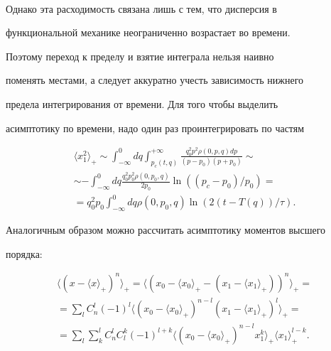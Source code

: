 $$

Однако эта расходимость связана лишь с тем, что дисперсия в

функциональной механике неограниченно возрастает во времени.

Поэтому переход к пределу и взятие интеграла нельзя наивно

поменять местами, а следует аккуратно учесть зависимость нижнего

предела интегрирования от времени. Для того чтобы выделить

асимптотику по времени, надо один раз проинтегрировать по частям



\pagebreak



\begin{multline}

\langle x_1^2\rangle_{+}\sim \int_{-\infty}^{0}

dq\int_{p_c(t,q)}^{+\infty}\frac{q^2_0p^2\rho

(0,p,q)dp}{(p-p_0)(p+p_0)}\sim

\\

\sim -\int_{-\infty}^{0}

dq\frac{q^2_0p^2_0\rho

(0,p_0,q)}{2p_0}\ln((p_c-p_0)/p_0)=

\\

=q^2_0p_0\int_{-\infty}^{0}

dq\rho (0,p_0,q)\ln(2(t-T(q))/\tau).

\end{multline}



Аналогичным образом можно рассчитать асимптотику моментов высшего

порядка:

\begin{multline}

\langle(x-\langle x\rangle_{+})^n\rangle_{+}=\langle(x_0-\langle

x_0\rangle_{+} -(x_1- \langle

x_1\rangle_{+}))^n\rangle_{+}=

\\

=\sum_l C_n^l

(-1)^l\langle(x_0-\langle x_0\rangle_{+})^{n-l}(x_1- \langle

x_1\rangle_{+})^l\rangle_{+}=

\\

=\sum_l\sum_k^{l} C_n^lC_l^k

(-1)^{l+k}\langle(x_0-\langle

x_0\rangle_{+})^{n-l}x_1^k\rangle_{+} \langle x_1\rangle^{l-k}_{+}.

\end{multline}

